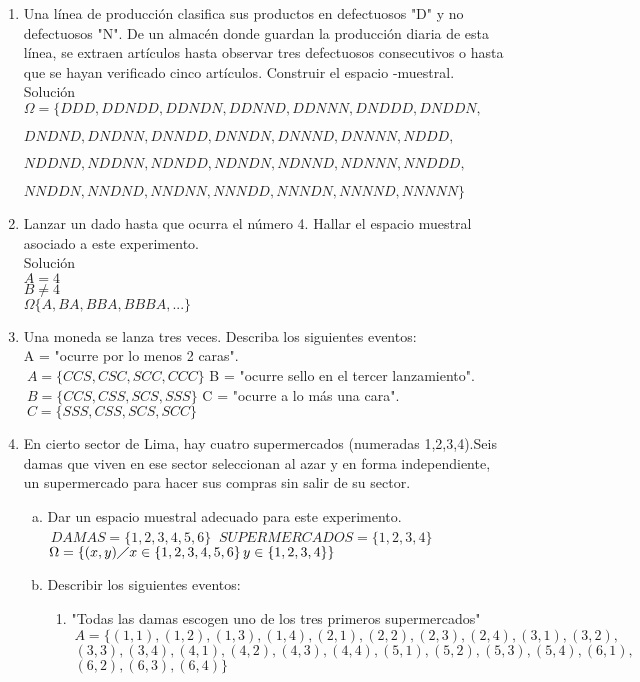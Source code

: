 \documentclass[12pt]{article}
\begin{document}
\begin{enumerate}
\item Una línea de producción clasifica sus productos en defectuosos "D" y no defectuosos "N". De un almacén donde guardan la producción diaria de esta línea, se extraen artículos hasta observar tres defectuosos consecutivos o hasta que se hayan verificado cinco artículos. Construir el espacio -muestral.\\
Solución\\
$\Omega=\lbrace DDD,DDNDD,DDNDN,DDNND,DDNNN,DNDDD,DNDDN,$

$ DNDND,DNDNN,DNNDD,DNNDN,DNNND,DNNNN,NDDD,$

$ NDDND,NDDNN,NDNDD,NDNDN,NDNND,NDNNN,NNDDD,$

$ NNDDN,NNDND,NNDNN,NNNDD,NNNDN,NNNND,NNNNN\rbrace$

\item Lanzar un dado hasta que ocurra el número 4. Hallar el espacio muestral asociado a este experimento.\\
Solución\\
$A = 4$\\
$B\not= 4$\\
$\Omega \lbrace A,BA,BBA,BBBA,...\rbrace$ 

\item Una moneda se lanza tres veces. Describa los siguientes eventos:\\
A = "ocurre por lo menos 2 caras".\\
$\ A=\lbrace CCS,CSC,SCC,CCC\rbrace$
B = "ocurre sello en el tercer lanzamiento".\\
$\ B=\lbrace CCS,CSS,SCS,SSS\rbrace$
C = "ocurre a lo más una cara".\\
$\ C=\lbrace SSS,CSS,SCS,SCC\rbrace$
\item En cierto sector de Lima, hay cuatro supermercados (numeradas 1,2,3,4).Seis damas que viven en ese sector seleccionan al azar y en forma independiente, un supermercado para hacer sus compras sin salir de su sector.
\begin{enumerate}[(a)]
\item Dar un espacio muestral adecuado para este experimento.\\
$\ DAMAS=\lbrace1,2,3,4,5,6\rbrace$    $\ SUPERMERCADOS=\lbrace1,2,3,4\rbrace$
$\Omega=\lbrace (x,y) \diagup x \in \lbrace1,2,3,4,5,6\rbrace   \,  y \in \lbrace1,2,3,4\rbrace \rbrace $
\item Describir los siguientes eventos:
\begin{enumerate}[A: ]

\item "Todas las damas escogen uno de los tres primeros supermercados" \\
$\ A=\lbrace (1,1),(1,2),(1,3),(1,4),(2,1),(2,2),(2,3),(2,4),(3,1),(3,2),$
$\ (3,3),(3,4),(4,1),(4,2),(4,3),(4,4),(5,1),(5,2),(5,3),(5,4),(6,1),$
$\ (6,2),(6,3),(6,4)\rbrace$


\end{enumerate}
\end{enumerate}
\end{enumerate}
\end{document}
